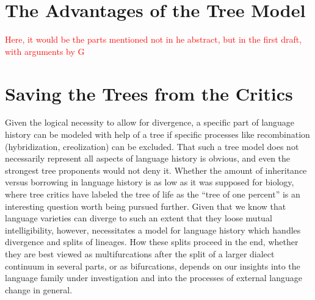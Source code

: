 \documentclass[svgnames,12pt]{scrartcl}
\newcommand\Comment[1]{\textcolor{red}{#1}}
\begin{document}
{\section{The Advantages of the Tree Model}
\Comment{Here, it would be the parts mentioned not in he abstract, but in the first draft, with
arguments by G}

\section{Saving the Trees from the Critics}
Given the logical necessity to allow for divergence, a specific part of language history can be
modeled with help of a tree if specific processes like recombination (hybridization, creolization)
can be excluded. That such a tree model does not necessarily represent all aspects of language
history is obvious, and even the strongest tree proponents would not deny it. Whether the amount
of inheritance versus borrowing in language history is as low as it was supposed for biology, where
tree critics have labeled the tree of life as the ``tree of one percent'' \citep{Dagan2006} is an
interesting question worth being pursued further. Given that we know that language varieties can
diverge to such an extent that they loose mutual intelligibility, however, necessitates a model for
language history which handles divergence and splits of lineages. How these splits proceed in the
end, whether they are best viewed as multifurcations after the split of a larger dialect continuum
in several parts, or as bifurcations, depends on our insights into the language family under
investigation and into the processes of external language change in general. 
}
\end{document}
